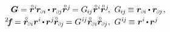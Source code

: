 \nopagebreak\vspace{-0.1em}
\begin{equation*}\label{componentsofdeformationtensors}
\begin{array}{r@{\hspace{.5em}}l}
\bm{G} = \initiallocationvector^i \hspace{-0.25ex} \currentlocationvector_\differentialindex{i} \hspace{-0.1ex} \dotp \currentlocationvector_\differentialindex{\hspace{-0.1ex}j} \initiallocationvector^j \hspace{-0.25ex}
= G_{\hspace{-0.15ex}i\hspace{-0.1ex}j} \hspace{.1ex} \initiallocationvector^i \initiallocationvector^j
\hspace{-0.3ex} , &
G_{\hspace{-0.15ex}i\hspace{-0.1ex}j} \hspace{-0.2ex} \equiv
\currentlocationvector_\differentialindex{i} \hspace{-0.1ex} \dotp \currentlocationvector_\differentialindex{\hspace{-0.1ex}j}
\hspace{.1ex} ,
\\[.25em]
%
{{^2}\hspace{-0.4ex}\bm{f}} \hspace{-0.2ex} =  \initiallocationvector_\differentialindex{i} \currentlocationvector^{i} \hspace{-0.2ex} \dotp \hspace{-0.15ex} \currentlocationvector^j \hspace{-0.1ex} \initiallocationvector_\differentialindex{\hspace{-0.1ex}j} \hspace{-0.2ex}
= G^{\hspace{.1ex}i\hspace{-0.1ex}j} \initiallocationvector_\differentialindex{i} \initiallocationvector_\differentialindex{\hspace{-0.1ex}j} \hspace{-0.2ex}
\hspace{.2ex} , &
G^{\hspace{.1ex}i\hspace{-0.1ex}j} \hspace{-0.2ex} \equiv
\currentlocationvector^{i} \hspace{-0.2ex} \dotp \hspace{-0.15ex} \currentlocationvector^j

\end{array}
\end{equation*}
